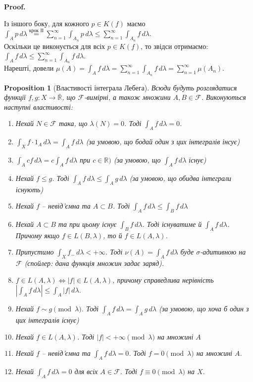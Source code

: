 \documentclass[a4paper, 10pt]{article}
\makeatletter
\theoremstyle{theoremdd}
\newtheorem{proposition}[theorem]{Proposition}
\renewenvironment{proof}[1][Proof.\\]{\par
\pushQED{\hfill \qed}%
\normalfont \topsep6\p@\@plus6\p@\relax
\trivlist
\item\relax
{\bfseries
#1\@addpunct{.}}\hspace\labelsep\ignorespaces
}{%
\popQED\endtrivlist\@endpefalse
}
\makeatother
\begin{document}
\begin{proof}
Із іншого боку, для кожного $p \in K(f)$ маємо $\displaystyle\int_A p\,d\lambda \overset{\text{крок ІІ}}{=} \sum_{n=1}^\infty \int_{A_n} p\,d\lambda \leq \sum_{n=1}^\infty \int_{A_n} f\,d\lambda$.\\
Оскільки це виконується для всіх $p \in K(f)$, то звідси отримаємо:\\
$\displaystyle\int_A f\,d\lambda \leq \displaystyle\sum_{n=1}^\infty \int_{A_n}f\,d\lambda$.\\
Нарешті, довели $\mu(A) = \displaystyle\int_A f\,d\lambda = \sum_{n=1}^\infty \int_{A_n} f\,d\lambda = \sum_{n=1}^\infty \mu(A_n)$.
\end{proof}

\begin{proposition}[Властивості інтеграла Лебега]
Всюди будуть розглядатися функції $f, g \colon X \to \bar{\mathbb{R}}$, що $\mathcal{F}$-вимірні, а також множини $A,B \in \mathcal{F}$. Виконуються наступні властивості:
\begin{enumerate}[nosep,wide=0pt,label={\arabic*)}]
\item Нехай $N \in \mathcal{F}$ така, що $\lambda(N) = 0$. Тоді $\displaystyle\int_A f\,d\lambda = 0$.
\item $\displaystyle\int_X f \cdot 1_A\,d\lambda = \int_A f\,d\lambda$ (за умовою, що бодай один з цих інтегралів інсує)
\item $\displaystyle\int_A c f\,d\lambda = c \int_A f\,d\lambda$ при $c \in \mathbb{R})$ (за умовою, що $\displaystyle\int_A f\,d\lambda$ існує)
\item Нехай $f \leq g$. Тоді $\displaystyle\int_A f\,d\lambda \leq \int_A g\,d\lambda$ (за умовою, що обидва інтеграли існують)
\item Нехай $f$ -- невід'ємна та $A \subset B$. Тоді $\displaystyle\int_A f\,d\lambda \leq \int_B f\,d\lambda$
\item Нехай $A \subset B$ та при цьому існує $\displaystyle\int_B f\,d\lambda$. Тоді існуватиме й $\displaystyle\int_A f\,d\lambda$. Причому якщо $f \in L(B,\lambda)$, то й $f \in L(A,\lambda)$.
\item Припустимо $\displaystyle\int_X f_-\,d\lambda < +\infty$. Тоді $\nu(A) = \displaystyle\int_A f\,d\lambda$ буде $\sigma$-адитивною на $\mathcal{F}$ (спойлер: дана функція множин задає заряд).
\item $f \in L(A,\lambda) \iff |f| \in L(A,\lambda)$, причому справедлива нерівність $\displaystyle\left| \int_A f\,d\lambda \right| \leq \int_A |f|\,d\lambda$.
\item Нехай $f \sim g \pmod \lambda$. Тоді $\displaystyle\int_A f\,d\lambda = \int_A g\,d\lambda$ (за умовою, що хоча б один з цих інтегралів існує)
\item Нехай $f \in L(A,\lambda)$. Тоді $|f| < +\infty \pmod \lambda$ на множині $A$
\item Нехай $f$ -- невід'ємна та $\displaystyle\int_A f\,d\lambda = 0$. Тоді $f = 0 \pmod \lambda$ на множині $A$.
\item Нехай $\displaystyle\int_A f\,d\lambda = 0$ для всіх $A \in \mathcal{F}$. Тоді $f \equiv 0 \pmod \lambda$ на $X$.
\end{enumerate}
\end{proposition}
\end{document}
